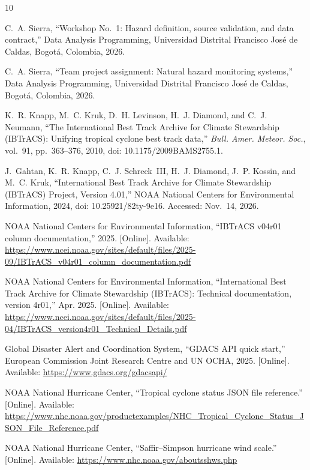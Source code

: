 \documentclass[10pt,twocolumn,letterpaper]{article}
\begin{document}
\balance
\begin{thebibliography}{10}
\footnotesize
\setlength{\itemsep}{1pt}

C.~A. Sierra, ``Workshop No.~1: Hazard definition, source validation, and data contract,'' Data Analysis Programming, Universidad Distrital Francisco José de Caldas, Bogotá, Colombia, 2026.

C.~A. Sierra, ``Team project assignment: Natural hazard monitoring systems,'' Data Analysis Programming, Universidad Distrital Francisco José de Caldas, Bogotá, Colombia, 2026.

K.~R. Knapp, M.~C. Kruk, D.~H. Levinson, H.~J. Diamond, and C.~J. Neumann, ``The International Best Track Archive for Climate Stewardship (IBTrACS): Unifying tropical cyclone best track data,'' \emph{Bull. Amer. Meteor. Soc.}, vol.~91, pp.~363--376, 2010, doi: 10.1175/2009BAMS2755.1.

J.~Gahtan, K.~R. Knapp, C.~J. Schreck~III, H.~J. Diamond, J.~P. Kossin, and M.~C. Kruk, ``International Best Track Archive for Climate Stewardship (IBTrACS) Project, Version 4.01,'' NOAA National Centers for Environmental Information, 2024, doi: 10.25921/82ty-9e16. Accessed: Nov.~14, 2026.

NOAA National Centers for Environmental Information, ``IBTrACS v04r01 column documentation,'' 2025. [Online]. Available: \url{https://www.ncei.noaa.gov/sites/default/files/2025-09/IBTrACS_v04r01_column_documentation.pdf}

NOAA National Centers for Environmental Information, ``International Best Track Archive for Climate Stewardship (IBTrACS): Technical documentation, version 4r01,'' Apr. 2025. [Online]. Available: \url{https://www.ncei.noaa.gov/sites/default/files/2025-04/IBTrACS_version4r01_Technical_Details.pdf}

Global Disaster Alert and Coordination System, ``GDACS API quick start,'' European Commission Joint Research Centre and UN OCHA, 2025. [Online]. Available: \url{https://www.gdacs.org/gdacsapi/}

NOAA National Hurricane Center, ``Tropical cyclone status JSON file reference.'' [Online]. Available: \url{https://www.nhc.noaa.gov/productexamples/NHC_Tropical_Cyclone_Status_JSON_File_Reference.pdf}

NOAA National Hurricane Center, ``Saffir--Simpson hurricane wind scale.'' [Online]. Available: \url{https://www.nhc.noaa.gov/aboutsshws.php}

\end{thebibliography}
\end{document}
